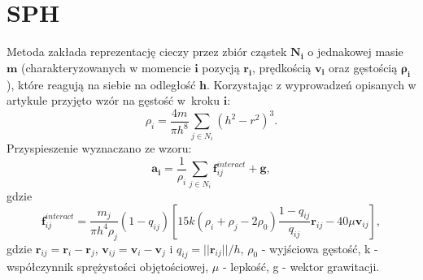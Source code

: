 \section{SPH}
Metoda zakłada reprezentację cieczy przez zbiór cząstek $\mathbf{N_i}$ o jednakowej masie $\mathbf{m}$ (charakteryzowanych w momencie $\mathbf{i}$ pozycją $\mathbf{r_i}$, prędkością $\mathbf{v_i}$ oraz gęstością $\mathbf{\rho_i}$ ), które reagują na siebie na odległość $\mathbf{h}$.
Korzystając z wyprowadzeń opisanych w artykule \cite{website:derive} przyjęto wzór na gęstość w~kroku $\mathbf{i}$:
\[ \rho_i = \frac{4m}{\pi h^8} \sum\limits_{j\in N_i} (h^2-r^2)^3.\]
Przyspieszenie wyznaczano ze wzoru:
\[ \mathbf{a_i} = \frac{1}{\rho_i} \sum\limits_{j\in N_i } \mathbf{f}_{ij}^{interact} + \mathbf{g} ,\]
gdzie
\[ \mathbf{f}_{ij}^{interact} = \frac{m_j}{\pi h^4 \rho_j} (1-q_{ij})\left[15k(\rho_i+\rho_j-2\rho_0) 
\frac{1-q_{ij}}{q_{ij}} \mathbf{r}_{ij} - 40\mu \mathbf{v}_{ij} \right] ,\]
gdzie $\mathbf{r}_{ij} = \mathbf{r}_i - \mathbf{r}_j$, $\mathbf{v}_{ij} = \mathbf{v}_i - \mathbf{v}_j$ i $q_{ij} = || \mathbf{r}_{ij} || /h$, $\rho_0$ - wyjściowa gęstość, k - współczynnik sprężystości objętościowej, $\mu$ - lepkość, g - wektor grawitacji.
